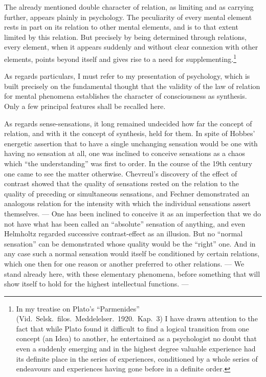 \documentclass[12pt]{article}
\newcommand{\opage}[1]{\marginnote{\footnotesize\textit{[#1]}}}
\begin{document}
The already mentioned double character of relation, as limiting and as
carrying further, appears plainly in psychology. The peculiarity of every
mental element rests in part on its relation to other mental elements, and
is to that extent limited by this relation. But precisely by being
determined through relations, every element, when it appears suddenly and
without clear connexion with other elements, points beyond itself and gives
rise to a need for supplementing.\footnote{In my treatise on Plato's
  ``Parmenides'' (Vid.\ Selsk.\ filos.\ Meddelelser.\ 1920.\ Kap.\ 3) I have
  drawn attention to the fact that while Plato found it difficult to find a
  logical transition from one concept (an Idea) to another, he entertained as
  a psychologist no doubt that even a suddenly emerging and in the highest
  degree valuable experience had its definite place in the series of
  experiences, conditioned by a whole series of endeavours and experiences
  having gone before in a definite order.}

As regards particulars, I must refer to my presentation of psychology, which
is built precisely on the \opage{18}fundamental thought that the validity of the law
of relation for mental phenomena establishes the character of consciousness
as synthesis. Only a few principal features shall be recalled here.

As regards sense-sensations, it long remained undecided how far the concept
of relation, and with it the concept of synthesis, held for them. In spite
of Hobbes' energetic assertion that to have a single unchanging sensation
would be one with having no sensation at all, one was inclined to conceive
sensations as a chaos which ``the understanding'' was first to order. In the
course of the 19th century one came to see the matter otherwise. Chevreul's
discovery of the effect of contrast showed that the quality of sensations
rested on the relation to the quality of preceding or simultaneous
sensations, and Fechner demonstrated an analogous relation for the intensity
with which the individual sensations assert themselves. --- One has been
inclined to conceive it as an imperfection that we do not have what has been
called an ``absolute'' sensation of anything, and even Helmholtz regarded
successive contrast-effect as an illusion. But no ``normal sensation'' can
be demonstrated whose quality would be the ``right'' one. And in any case
such a normal sensation would itself be conditioned by certain relations,
which one then for one reason or another preferred to other relations. ---
We stand already here, with these elementary phenomena, before something
that will show itself to hold for the highest intellectual functions. ---
\end{document}
